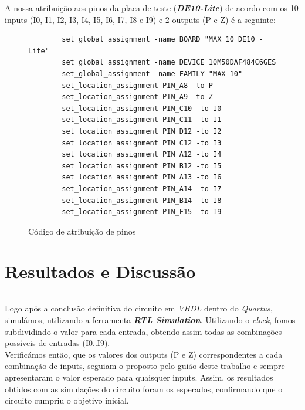 \documentclass[12pt]{article}
\begin{document}
A nossa atribuição aos pinos da placa de teste (\textit{\textbf{DE10-Lite}}) de acordo com os 10 inputs (I0, I1, I2, I3, I4, I5, I6, I7, I8 e I9) e 2 outputs (P e Z) é a seguinte: 
\begin{figure}[H]

    \begin{BVerbatim}
        set_global_assignment -name BOARD "MAX 10 DE10 - Lite"
        set_global_assignment -name DEVICE 10M50DAF484C6GES
        set_global_assignment -name FAMILY "MAX 10"
        set_location_assignment PIN_A8 -to P
        set_location_assignment PIN_A9 -to Z
        set_location_assignment PIN_C10 -to I0
        set_location_assignment PIN_C11 -to I1
        set_location_assignment PIN_D12 -to I2
        set_location_assignment PIN_C12 -to I3
        set_location_assignment PIN_A12 -to I4
        set_location_assignment PIN_B12 -to I5
        set_location_assignment PIN_A13 -to I6
        set_location_assignment PIN_A14 -to I7
        set_location_assignment PIN_B14 -to I8
        set_location_assignment PIN_F15 -to I9
    \end{BVerbatim}
    \caption{Código de atribuição de pinos}
\end{figure}

\newpage

\section{Resultados e Discussão}
\hrule
\vspace{0.5cm}

Logo após a conclusão definitiva do circuito  em \textit{VHDL} dentro do \textit{Quartus}, simulámos, utilizando a ferramenta \textbf{\textit{RTL Simulation}}. Utilizando o \textit{clock}, fomos subdividindo o valor para cada entrada, obtendo assim todas as combinações possíveis de entradas (I0..I9).\\

Verificámos então, que os valores dos outputs (P e Z) correspondentes a cada combinação de inputs, seguiam o proposto pelo guião deste trabalho e sempre apresentaram o valor esperado para quaisquer inputs.
Assim, os resultados obtidos com as simulações do circuito foram os esperados, confirmando que o circuito cumpriu o objetivo inicial.
\end{document}

